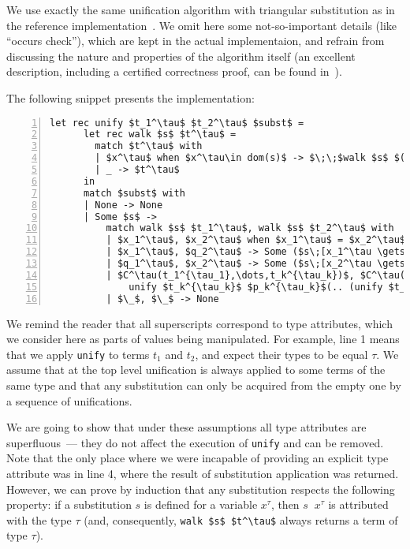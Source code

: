 We use exactly the same unification algorithm with triangular substitution as in the reference implementation~\cite{MicroKanren}. We
omit here some not-so-important details (like ``occurs check''), which are kept in the actual implementaion, and refrain from discussing
the nature and properties of the algorithm
itself (an excellent description, including a certified correctness proof, can be found in~\cite{Kumar}).

The following snippet presents the implementation:

\begin{lstlisting}[mathescape=true,numbers=left,numberstyle=\small,stepnumber=1,numbersep=-5pt]
    let rec unify $t_1^\tau$ $t_2^\tau$ $subst$ =
      let rec walk $s$ $t^\tau$ =
        match $t^\tau$ with
        | $x^\tau$ when $x^\tau\in dom(s)$ -> $\;\;$walk $s$ $(s\;\;x^\tau)$
        | _ -> $t^\tau$
      in
      match $subst$ with
      | None -> None
      | Some $s$ ->
          match walk $s$ $t_1^\tau$, walk $s$ $t_2^\tau$ with
          | $x_1^\tau$, $x_2^\tau$ when $x_1^\tau$ = $x_2^\tau$ -> $subst$
          | $x_1^\tau$, $q_2^\tau$ -> Some ($s\;[x_1^\tau \gets q_2^\tau]$)
          | $q_1^\tau$, $x_2^\tau$ -> Some ($s\;[x_2^\tau \gets q_1^\tau]$)
          | $C^\tau(t_1^{\tau_1},\dots,t_k^{\tau_k})$, $C^\tau(p_1^{\tau_1},\dots,p_k^{\tau_k})$ ->
              unify $t_k^{\tau_k}$ $p_k^{\tau_k}$(.. (unify $t_1^{\tau_1}$ $p_1^{\tau_1}$ $subst$)$..$)
          | $\_$, $\_$ -> None
\end{lstlisting}

We remind the reader that all superscripts correspond to type attributes, which we consider here as
parts of values being manipulated. For example, line 1 means that we apply \lstinline|unify|
to terms $t_1$ and $t_2$, and expect their types to be equal $\tau$.
We assume that at the top level unification is always applied to some terms of the same type and that any
substitution can only be acquired from the empty one by a sequence of unifications.

We are going to show that under these assumptions all type attributes are superfluous~--- they
do not affect the execution of \lstinline|unify| and can be removed. Note that the only place where we
were incapable of providing an explicit type attribute was in line 4, where the result of
substitution application was returned.
However, we can prove by induction that any substitution respects the following property: if a substitution $s$ is defined for a variable $x^\tau$,
then $s\;\;x^\tau$ is attributed with the type $\tau$ (and, consequently, \lstinline|walk $s$ $t^\tau$| always returns a term of type $\tau$).

